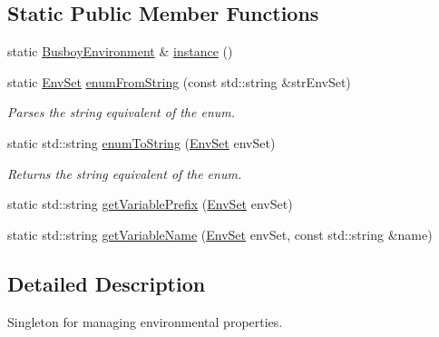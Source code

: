 \subsection*{Static Public Member Functions}
\begin{DoxyCompactItemize}
\item 
static \hyperlink{classBUSBOY_1_1BusboyEnvironment}{BusboyEnvironment} \& \hyperlink{classBUSBOY_1_1BusboyEnvironment_a06ca687507e5be7e839aa4d4de5f8931}{instance} ()
\item 
static \hyperlink{classBUSBOY_1_1BusboyEnvironment_a1ff6c2014ac112710c1a91fcefd18f58}{EnvSet} \hyperlink{classBUSBOY_1_1BusboyEnvironment_a51027f0a6a448a5b8bf4588a9055fdb6}{enumFromString} (const std::string \&strEnvSet)
\begin{DoxyCompactList}\small\item\em Parses the string equivalent of the enum. \item\end{DoxyCompactList}\item 
static std::string \hyperlink{classBUSBOY_1_1BusboyEnvironment_a4566e20c382a55bb6d733c1a72282461}{enumToString} (\hyperlink{classBUSBOY_1_1BusboyEnvironment_a1ff6c2014ac112710c1a91fcefd18f58}{EnvSet} envSet)
\begin{DoxyCompactList}\small\item\em Returns the string equivalent of the enum. \item\end{DoxyCompactList}\item 
static std::string \hyperlink{classBUSBOY_1_1BusboyEnvironment_a29a094cb93bb81775005cf2ad71106e2}{getVariablePrefix} (\hyperlink{classBUSBOY_1_1BusboyEnvironment_a1ff6c2014ac112710c1a91fcefd18f58}{EnvSet} envSet)
\item 
static std::string \hyperlink{classBUSBOY_1_1BusboyEnvironment_ad856c8aeab75e7498f50b8ee9b5b70a5}{getVariableName} (\hyperlink{classBUSBOY_1_1BusboyEnvironment_a1ff6c2014ac112710c1a91fcefd18f58}{EnvSet} envSet, const std::string \&name)
\end{DoxyCompactItemize}


\subsection{Detailed Description}
Singleton for managing environmental properties. 

